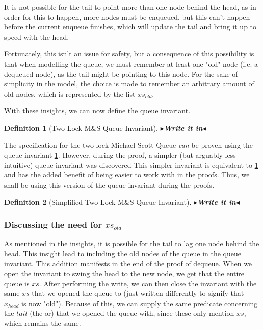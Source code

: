\documentclass[twoside,11pt,openright]{report}
\newtheorem{definition}{Definition}[section]
\newcommand{\todo}[1]{{\color[rgb]{.5,0,0}\textbf{$\blacktriangleright$#1$\blacktriangleleft$}}}
\begin{document}
It is not possible for the tail to point more than one node behind the head, as in order for this to happen, more nodes must be enqueued, but this can't happen before the current enqueue finishes, which will update the tail and bring it up to speed with the head.

Fortunately, this isn't an issue for safety, but a consequence of this possibility is that when modelling the queue, we must remember at least one "old" node (i.e. a dequeued node), as the tail might be pointing to this node. For the sake of simplicity in the model, the choice is made to remember an arbitrary amount of old nodes, which is represented by the list $xs_{old}$.


With these insights, we can now define the queue invariant.

\begin{definition}[Two-Lock M\&S-Queue Invariant]\label{MSQTL:spec:invariant}
  \todo{Write it in}
\end{definition}

The specification for the two-lock Michael Scott Queue \textit{can} be proven using the queue invariant \ref{MSQTL:spec:invariant}. However, during the proof, a simpler (but arguably less intuitive) queue invariant was discovered This simpler invariant is equivalent to \ref{MSQTL:spec:invariant} and has the added benefit of being easier to work with in the proofs. Thus, we shall be using this version of the queue invariant during the proofs.

\begin{definition}[Simplified Two-Lock M\&S-Queue Invariant]\label{MSQTL:spec:invariant:simple}
  \todo{Write it in}
\end{definition}


\subsubsection{Discussing the need for $xs_{old}$}\label{MSQTL:Discussion:xs_old}

As mentioned in the insights, it is possible for the tail to lag one node behind the head. This insight lead to including the old nodes of the queue in the queue invariant. This addition manifests in the end of the proof of dequeue. When we open the invariant to swing the head to the new node, we get that the entire queue is $xs$. After performing the write, we can then close the invariant with the same $xs$ that we opened the queue to (just written differently to signify that $x_{head}$ is now "old"). Because of this, we can supply the same predicate concerning the $tail$ (the or) that we opened the queue with, since these only mention $xs$, which remains the same.
\end{document}
